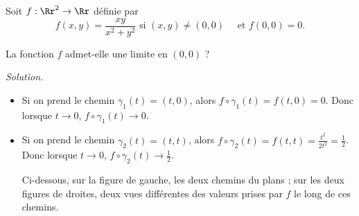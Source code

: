 \documentclass[12pt, class=report,crop=false]{standalone}
\begin{document}
\begin{exemple}
Soit $f : \Rr^2 \to \Rr$ définie par 
$$f(x,y) = \frac{xy}{x^2+y^2} \text{ si } (x,y) \neq (0,0) \quad \text{ et }
f(0,0) =0.$$

La fonction $f$ admet-elle une limite en $(0,0)$ ?

\bigskip
\emph{Solution.}

\begin{itemize}
  \item Si on prend le chemin $\gamma_1(t) = (t,0)$, alors 
  $f \circ \gamma_1 (t) = f(t,0) = 0$. Donc lorsque $t \to 0$, $f \circ \gamma_1 (t) \to 0$.
  
  \item Si on prend le chemin $\gamma_2(t) = (t,t)$, alors 
  $f \circ \gamma_2 (t) = f(t,t) = \frac{t^2}{2t^2} = \frac12$. Donc lorsque $t \to 0$, $f \circ \gamma_2 (t) \to \frac 12$.


Ci-dessous, sur la figure de gauche, les deux chemins du plans ; 
sur les deux figures de droites, deux vues différentes des valeurs prises par $f$ le long de ces chemins.


\end{itemize}
\end{exemple}
\end{document}
